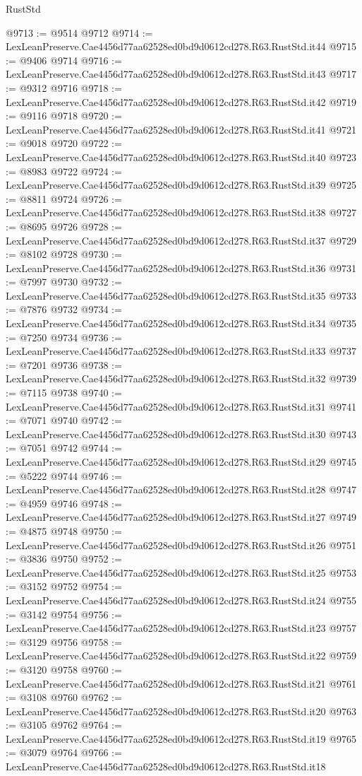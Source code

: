 \begin{lexlean}{RustStd}
\begin{coremodule}
@9713 := @9514 @9712
@9714 := LexLeanPreserve.Cae4456d77aa62528ed0bd9d0612cd278.R63.RustStd.it44
@9715 := @9406 @9714
@9716 := LexLeanPreserve.Cae4456d77aa62528ed0bd9d0612cd278.R63.RustStd.it43
@9717 := @9312 @9716
@9718 := LexLeanPreserve.Cae4456d77aa62528ed0bd9d0612cd278.R63.RustStd.it42
@9719 := @9116 @9718
@9720 := LexLeanPreserve.Cae4456d77aa62528ed0bd9d0612cd278.R63.RustStd.it41
@9721 := @9018 @9720
@9722 := LexLeanPreserve.Cae4456d77aa62528ed0bd9d0612cd278.R63.RustStd.it40
@9723 := @8983 @9722
@9724 := LexLeanPreserve.Cae4456d77aa62528ed0bd9d0612cd278.R63.RustStd.it39
@9725 := @8811 @9724
@9726 := LexLeanPreserve.Cae4456d77aa62528ed0bd9d0612cd278.R63.RustStd.it38
@9727 := @8695 @9726
@9728 := LexLeanPreserve.Cae4456d77aa62528ed0bd9d0612cd278.R63.RustStd.it37
@9729 := @8102 @9728
@9730 := LexLeanPreserve.Cae4456d77aa62528ed0bd9d0612cd278.R63.RustStd.it36
@9731 := @7997 @9730
@9732 := LexLeanPreserve.Cae4456d77aa62528ed0bd9d0612cd278.R63.RustStd.it35
@9733 := @7876 @9732
@9734 := LexLeanPreserve.Cae4456d77aa62528ed0bd9d0612cd278.R63.RustStd.it34
@9735 := @7250 @9734
@9736 := LexLeanPreserve.Cae4456d77aa62528ed0bd9d0612cd278.R63.RustStd.it33
@9737 := @7201 @9736
@9738 := LexLeanPreserve.Cae4456d77aa62528ed0bd9d0612cd278.R63.RustStd.it32
@9739 := @7115 @9738
@9740 := LexLeanPreserve.Cae4456d77aa62528ed0bd9d0612cd278.R63.RustStd.it31
@9741 := @7071 @9740
@9742 := LexLeanPreserve.Cae4456d77aa62528ed0bd9d0612cd278.R63.RustStd.it30
@9743 := @7051 @9742
@9744 := LexLeanPreserve.Cae4456d77aa62528ed0bd9d0612cd278.R63.RustStd.it29
@9745 := @5222 @9744
@9746 := LexLeanPreserve.Cae4456d77aa62528ed0bd9d0612cd278.R63.RustStd.it28
@9747 := @4959 @9746
@9748 := LexLeanPreserve.Cae4456d77aa62528ed0bd9d0612cd278.R63.RustStd.it27
@9749 := @4875 @9748
@9750 := LexLeanPreserve.Cae4456d77aa62528ed0bd9d0612cd278.R63.RustStd.it26
@9751 := @3836 @9750
@9752 := LexLeanPreserve.Cae4456d77aa62528ed0bd9d0612cd278.R63.RustStd.it25
@9753 := @3152 @9752
@9754 := LexLeanPreserve.Cae4456d77aa62528ed0bd9d0612cd278.R63.RustStd.it24
@9755 := @3142 @9754
@9756 := LexLeanPreserve.Cae4456d77aa62528ed0bd9d0612cd278.R63.RustStd.it23
@9757 := @3129 @9756
@9758 := LexLeanPreserve.Cae4456d77aa62528ed0bd9d0612cd278.R63.RustStd.it22
@9759 := @3120 @9758
@9760 := LexLeanPreserve.Cae4456d77aa62528ed0bd9d0612cd278.R63.RustStd.it21
@9761 := @3108 @9760
@9762 := LexLeanPreserve.Cae4456d77aa62528ed0bd9d0612cd278.R63.RustStd.it20
@9763 := @3105 @9762
@9764 := LexLeanPreserve.Cae4456d77aa62528ed0bd9d0612cd278.R63.RustStd.it19
@9765 := @3079 @9764
@9766 := LexLeanPreserve.Cae4456d77aa62528ed0bd9d0612cd278.R63.RustStd.it18

\end{coremodule}
\end{lexlean}
